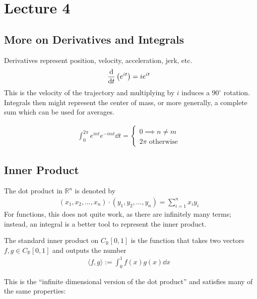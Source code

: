 \section{Lecture 4}
\subsection{More on Derivatives and Integrals}
Derivatives represent position, velocity, acceleration, jerk, etc.
\begin{align}
    \dv{}{t} \left(e^{it} \right) = ie^{it}
\end{align}
This is the velocity of the trajectory and multiplying by $i$ induces a $90^\circ$ rotation. Integrals then might represent the center of mass, or more generally, a complete sum which can be used for averages.
\begin{lemma}
    \begin{align}
        \int_0^{2\pi} e^{int}e^{-imt} \dd{t} = \begin{cases}
            0 \implies n\ne m\\
            2\pi \text{ otherwise}
        \end{cases}
    \end{align}
\end{lemma}

\subsection{Inner Product}
The dot product in $\mathbb{R}^n$ is denoted by
\begin{align}
    (x_1, x_2, ..., x_n) \cdot (y_1, y_2, ..., y_n) = \sum_{i=1}^n x_iy_i
\end{align}
For functions, this does not quite work, as there are infinitely many terms; instead, an integral is a better tool to represent the inner product.
\begin{definition}
    The standard inner product on $C_\mathbb{R}[0,1]$ is the function that takes two vectors $f, g \in C_\mathbb{R}[0,1]$ and outputs the number
    \begin{align}
        \langle f, g \rangle := \int_0^1 f(x)g(x) \dd{x}
    \end{align}
\end{definition}
This is the ``infinite dimensional version of the dot product'' and satisfies many of the same properties:
